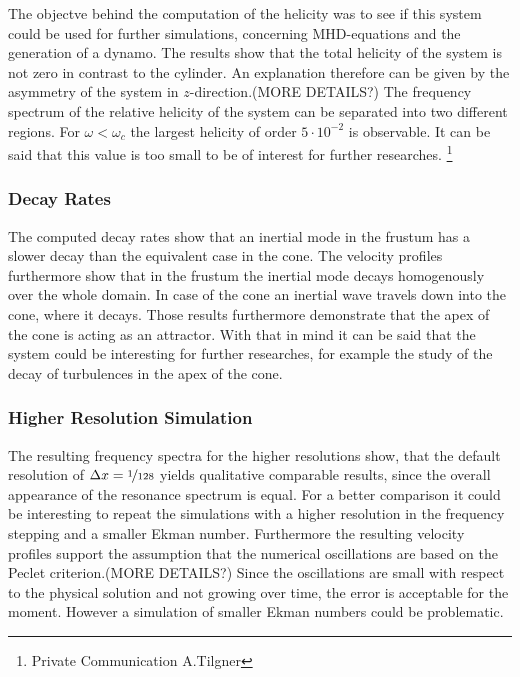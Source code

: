 The objectve behind the computation of the helicity was to see if this system could be used
for further simulations, concerning MHD-equations and the generation of a dynamo.
The results show that the total helicity of the system is not zero in contrast to the cylinder.
An explanation therefore can be given by the asymmetry of the system in $z$-direction.(MORE DETAILS?)
The frequency spectrum of the relative helicity of the  system can be separated into two different regions.
For $\omega<\omega_c$ the largest helicity of order $5\cdot10^{-2}$ is observable.
It can be said that this value is too small to be of interest for further researches.
\footnote{Private Communication A.Tilgner}


\subsubsection{Decay Rates}

The computed decay rates show that an inertial mode in the frustum has a slower decay
than the equivalent case in the cone.
The velocity profiles furthermore show that in the frustum the inertial mode decays homogenously over the whole domain.
In case of the cone an inertial wave travels down into the cone, where it decays.
Those results furthermore demonstrate that the apex of the cone is acting as an attractor.
With that in mind it can be said that the system could be interesting for further researches,
for example the study of the decay of turbulences in the apex of the cone.

\subsubsection{Higher Resolution Simulation}

The resulting frequency spectra for the higher resolutions show,
that the default resolution of ${\Delta x = \nicefrac{1}{128}}$ yields
qualitative comparable results, since the overall appearance of the resonance spectrum
is equal.
For a better comparison it could be interesting to repeat the simulations with a
higher resolution in the frequency stepping and a smaller Ekman number.
Furthermore the resulting velocity profiles support the assumption
that the numerical oscillations are based on the Peclet criterion.(MORE DETAILS?)
Since the oscillations are small with respect to the physical solution and not
growing over time, the error is acceptable for the moment.
However a simulation of smaller Ekman numbers could be problematic.
\clearpage

